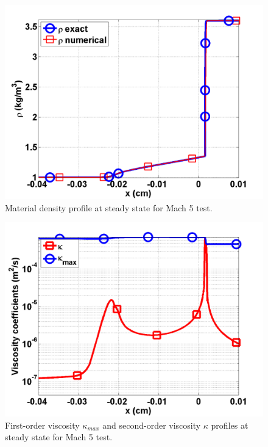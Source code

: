 \documentclass[review]{elsarticle}
\begin{document}
\begin{figure}[H]
                \centering
                \includegraphics[width=\textwidth]{Mach_5_nel_2000_density.png}
        \caption{Material density profile at steady state for Mach 5 test.}\label{fig:Mach5_density}
\end{figure}
\begin{figure}[H]
                \centering
                \includegraphics[width=\textwidth]{Mach_5_nel_2000_viscosity.png}
        \caption{First-order viscosity $\kappa_{max}$ and second-order viscosity $\kappa$ profiles at steady state for Mach 5 test.}\label{fig:Mach5_viscosity}
\end{figure}
\end{document}
